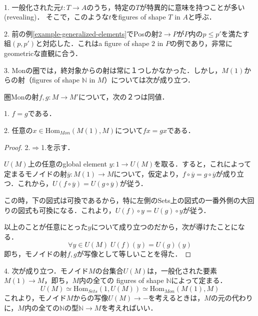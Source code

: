 \documentclass[uplatex, 12pt, dvipdfmx]{jsarticle}
\begin{document}
\begin{example}　

    1. 一般化された元$t:T\to A$のうち，特定の$T$が特異的に意味を持つことが多い(revealing)．
    そこで，このような$t$をfigures of shape $T$ in $A$と呼ぶ．
    \vspace{1cm}

    2. 前の例\ref{example-generalized-elements}でPosの射$2\to P$が$P$内の$p\le p'$を満たす組$(p,p')$と対応した．これはa figure of shape $2$ in $P$の例であり，非常にgeometricな直観に合う．
\vspace{1cm}

    3. Monの圏では，終対象からの射は常に１つしかなかった．しかし，$M(1)$からの射（figures of shape $\mathbb{N}$ in $M$）については次が成り立つ．
    \begin{proposition*}[$M(1)$-値点がモノイドの射を決定する]
        圏Monの射$f,g:M\to M'$について，次の２つは同値．

        1. $f=g$である．

        2. 任意の$x\in \mathrm{Hom}_{Mon}(M(1),M)$について$fx=gx$である．
    \end{proposition*}
    \begin{proof}
        2.$\Rightarrow$1.を示す．
        
        $U(M)$上の任意のglobal element $y:1\to U(M)$を取る．すると，これによって定まるモノイドの射$\overline{y}:M(1)\to M$について，仮定より，$f\circ \overline{y}=g\circ\overline{y}$が成り立つ．これから，$U(f\circ\overline{y})=U(g\circ\overline{y})$が従う．
        
        この時，下の図式は可換であるから，特に左側のSets上の図式の一番外側の大回りの図式も可換になる．これより，$U(f)\circ y=U(g)\circ y$が従う．
        \begin{center}
        \end{center}

        以上のことが任意にとった$y$について成り立つのだから，次が導けたことになる．
        \[\forall y\in U(M)\; U(f)(y)=U(g)(y) \]
        即ち，モノイドの射$f,g$が写像として等しいことを得た．
    \end{proof}
\vspace{3cm}

    4. 次が成り立つ．モノイド$M$の台集合$U(M)$は，一般化された要素$M(1)\to M$，即ち，$M$内の全ての figures of shape $\mathbb{N}$によって定まる．
    \[ U(M)\simeq \mathrm{Hom}_{Sets}(1,U(M))\simeq \mathrm{Hom}_{Mon}(M(1),M) \]
    これより，モノイド$M$からの写像$U(M)\to -$を考えるときは，$M$の元の代わりに，$M$内の全ての$\mathbb{N}$の型$\mathbb{N}\to M$を考えればいい．
\end{example}
\end{document}
